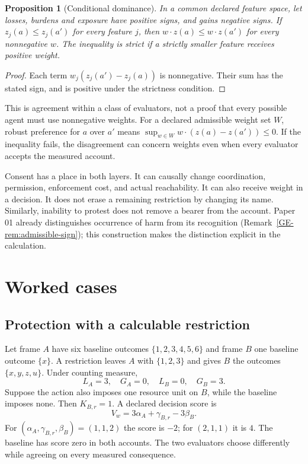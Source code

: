 \documentclass[11pt,a4paper]{article}
\newtheorem{proposition}[definition]{Proposition}
\theoremstyle{remark}
\begin{document}
\begin{proposition}[Conditional dominance]\label{prop:dominance}
In a common declared feature space, let losses, burdens and exposure have
positive signs, and gains negative signs. If $z_j(a)\leq z_j(a')$ for every
feature $j$, then $w\cdot z(a)\leq w\cdot z(a')$ for every nonnegative $w$.
The inequality is strict if a strictly smaller feature receives positive weight.
\end{proposition}
\begin{proof}
Each term $w_j(z_j(a')-z_j(a))$ is nonnegative. Their sum has the stated sign,
and is positive under the strictness condition.
\end{proof}

This is agreement within a class of evaluators, not a proof that every possible
agent must use nonnegative weights. For a declared admissible weight set $W$,
robust preference for $a$ over $a'$ means
$\sup_{w\in W}w\cdot(z(a)-z(a'))\leq0$. If the inequality fails, the disagreement
can concern weights even when every evaluator accepts the measured account.

Consent has a place in both layers. It can causally change coordination,
permission, enforcement cost, and actual reachability. It can also receive
weight in a decision. It does not erase a remaining restriction by changing
its name. Similarly, inability to protest does not remove a bearer from the
account. Paper 01 already distinguishes occurrence of harm from its recognition
(Remark~\ref{GE-rem:admissible-sign}); this construction makes the distinction
explicit in the calculation.

\section{Worked cases}\label{sec:cases}

\subsection{Protection with a calculable restriction}\label{sec:protection}

Let frame $A$ have six baseline outcomes $\{1,2,3,4,5,6\}$ and frame $B$ one
baseline outcome $\{x\}$. A restriction leaves $A$ with $\{1,2,3\}$ and gives
$B$ the outcomes $\{x,y,z,u\}$. Under counting measure,
\[
L_A=3,\quad G_A=0,\quad L_B=0,\quad G_B=3.
\]
Suppose the action also imposes one resource unit on $B$, while the baseline
imposes none. Then $K_{B,r}=1$. A declared decision score is
\begin{equation}\label{eq:example}
V_w=3\alpha_A+\gamma_{B,r}-3\beta_B.
\end{equation}
For $(\alpha_A,\gamma_{B,r},\beta_B)=(1,1,2)$ the score is $-2$; for
$(2,1,1)$ it is $4$. The baseline has score zero in both accounts. The two
evaluators choose differently while agreeing on every measured consequence.
\end{document}
